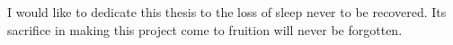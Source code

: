 
\begin{dedication}

    I would like to dedicate this thesis to the loss of sleep never to be recovered. Its sacrifice in making this project come to fruition will never be forgotten.

\end{dedication}

